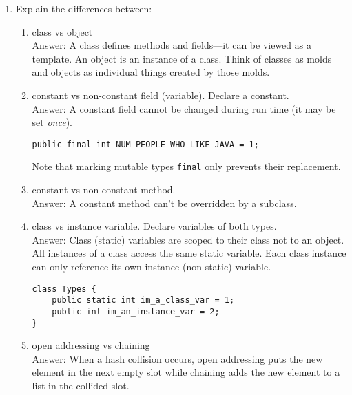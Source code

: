 \documentclass[11pt]{article}
\newenvironment{answer}{\large\lstset{basicstyle=\large\ttfamily}\color{white} \small{Answer:}}{}
\newenvironment{answer}{\large\lstset{basicstyle=\large\ttfamily}\color{red} \small{Answer:}}{}
\begin{document}
\begin{enumerate}
\item Explain the differences between:
\begin{enumerate}
	\item class vs object \\
	\begin{answer}
	A class defines methods and fields---it can be viewed as a template. An object is an instance of a class. Think of classes as molds and objects as individual things created by those molds.
	\end{answer}	
	
	\item constant vs non-constant field (variable).  Declare a constant. \\
	\begin{answer}
	A constant field cannot be changed during run time (it may be set {\em once}).
		\begin{lstlisting}[numbers=none]
public final int NUM_PEOPLE_WHO_LIKE_JAVA = 1;
		\end{lstlisting}
	Note that marking mutable types \texttt{final} only prevents their replacement.
	\end{answer}
	
	\item constant vs non-constant method.  \\
	\begin{answer}
	A constant method can't be overridden by a subclass.
	\end{answer}

	\item class vs instance variable.  Declare variables of both types.\\
	\begin{answer}
	Class (static) variables are scoped to their class not to an object.  All instances of a class access the same static variable.  Each class instance can only reference its own instance (non-static) variable.
		\begin{lstlisting}[numbers=none]
class Types {
	public static int im_a_class_var = 1;
	public int im_an_instance_var = 2;
}
		\end{lstlisting}
	\end{answer}
	
	\item open addressing vs chaining \\
	\begin{answer}
	When a hash collision occurs, open addressing puts the new element in the next empty slot while chaining adds the new element to a list in the collided slot.  
	\end{answer}
\end{enumerate}




\end{enumerate}
\end{document}
